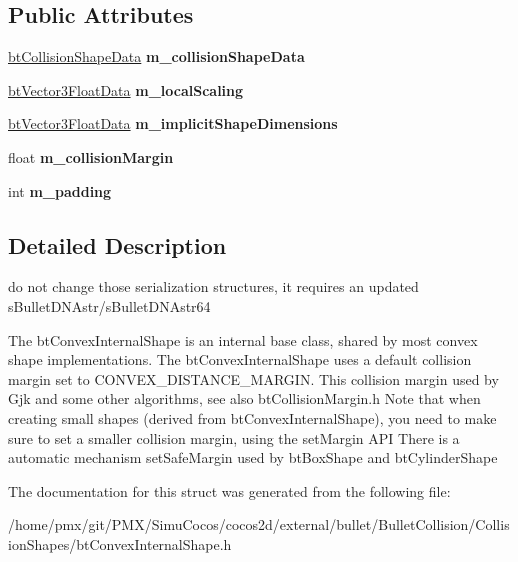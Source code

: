 \subsection*{Public Attributes}
\begin{DoxyCompactItemize}
\item 
\mbox{\label{structbtConvexInternalShapeData_ae3d01d09252583c2eafaff69fc3b9b8a}} 
\hyperlink{structbtCollisionShapeData}{bt\+Collision\+Shape\+Data} {\bfseries m\+\_\+collision\+Shape\+Data}
\item 
\mbox{\label{structbtConvexInternalShapeData_aa796d833f0645854758e66f49ba85f8e}} 
\hyperlink{structbtVector3FloatData}{bt\+Vector3\+Float\+Data} {\bfseries m\+\_\+local\+Scaling}
\item 
\mbox{\label{structbtConvexInternalShapeData_a4345edbcc0c3a1c43ac9ef5aaba2a4f9}} 
\hyperlink{structbtVector3FloatData}{bt\+Vector3\+Float\+Data} {\bfseries m\+\_\+implicit\+Shape\+Dimensions}
\item 
\mbox{\label{structbtConvexInternalShapeData_a56149d2d6b4bd8312309255dfa313981}} 
float {\bfseries m\+\_\+collision\+Margin}
\item 
\mbox{\label{structbtConvexInternalShapeData_adceba766bdf7c238289cbada9bd17193}} 
int {\bfseries m\+\_\+padding}
\end{DoxyCompactItemize}


\subsection{Detailed Description}
do not change those serialization structures, it requires an updated s\+Bullet\+D\+N\+Astr/s\+Bullet\+D\+N\+Astr64 

The bt\+Convex\+Internal\+Shape is an internal base class, shared by most convex shape implementations. The bt\+Convex\+Internal\+Shape uses a default collision margin set to C\+O\+N\+V\+E\+X\+\_\+\+D\+I\+S\+T\+A\+N\+C\+E\+\_\+\+M\+A\+R\+G\+IN. This collision margin used by Gjk and some other algorithms, see also bt\+Collision\+Margin.\+h Note that when creating small shapes (derived from bt\+Convex\+Internal\+Shape), you need to make sure to set a smaller collision margin, using the \textquotesingle{}set\+Margin\textquotesingle{} A\+PI There is a automatic mechanism \textquotesingle{}set\+Safe\+Margin\textquotesingle{} used by bt\+Box\+Shape and bt\+Cylinder\+Shape 

The documentation for this struct was generated from the following file\+:\begin{DoxyCompactItemize}
\item 
/home/pmx/git/\+P\+M\+X/\+Simu\+Cocos/cocos2d/external/bullet/\+Bullet\+Collision/\+Collision\+Shapes/bt\+Convex\+Internal\+Shape.\+h\end{DoxyCompactItemize}
